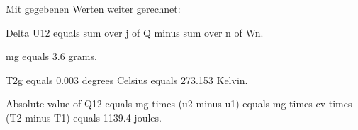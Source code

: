 Mit gegebenen Werten weiter gerechnet:

Delta U12 equals sum over j of Q minus sum over n of Wn.

mg equals 3.6 grams.

T2g equals 0.003 degrees Celsius equals 273.153 Kelvin.

Absolute value of Q12 equals mg times (u2 minus u1) equals mg times cv times (T2 minus T1) equals 1139.4 joules.